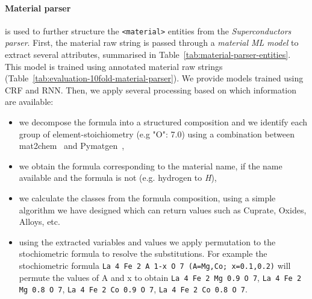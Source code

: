 \documentclass{article}
\begin{document}
\paragraph{Material parser} is used to further structure the \texttt{<material>} entities from the \textit{Superconductors parser}. 
First, the material raw string is passed through a \textit{material ML model} to extract several attributes, summarised in Table~\ref{tab:material-parser-entities}. 
This model is trained using annotated material raw strings (Table~\ref{tab:evaluation-10fold-material-parser}). 
We provide models trained using CRF and RNN.
Then, we apply several processing based on which information are available: 
\begin{itemize}
    \item we decompose the formula into a structured composition and we identify each group of element-stoichiometry (e.g "O": 7.0) using a combination between mat2chem~\cite{kononova_text-mined_2019} and Pymatgen~\cite{Ong2013}, 
    \item we obtain the formula corresponding to the material name, if the name available and the formula is not (e.g. hydrogen to \textit{H}), 
    \item we calculate the classes from the formula composition, using a simple algorithm we have designed which can return values such as Cuprate, Oxides, Alloys, etc.
    \item using the extracted variables and values we apply permutation to the stochiometric formula to resolve the substitutions. For example the stochiometric formula \texttt{La 4 Fe 2 A 1-x O 7 (A=Mg,Co; x=0.1,0.2)} will permute the values of A and x to obtain \texttt{La 4 Fe 2 Mg 0.9 O 7}, \texttt{La 4 Fe 2 Mg 0.8 O 7}, \texttt{La 4 Fe 2 Co 0.9 O 7}, \texttt{La 4 Fe 2 Co 0.8 O 7}.
\end{itemize}
\end{document}
